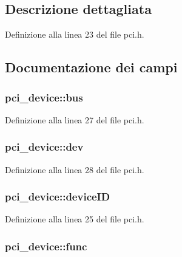\subsection{Descrizione dettagliata}


Definizione alla linea 23 del file pci.\+h.



\subsection{Documentazione dei campi}
\hypertarget{structpci__device_a832940e219d52a08725a39fc97663d07}{
\subsubsection[{bus}]{ pci\+\_\+device\+::bus}}\label{structpci__device_a832940e219d52a08725a39fc97663d07}


Definizione alla linea 27 del file pci.\+h.

\hypertarget{structpci__device_ae456e0d5fb85c5d367b1a4e27f996b96}{
\subsubsection[{dev}]{ pci\+\_\+device\+::dev}}\label{structpci__device_ae456e0d5fb85c5d367b1a4e27f996b96}


Definizione alla linea 28 del file pci.\+h.

\hypertarget{structpci__device_a86ce8ddd306b0395037ec7eee789a929}{
\subsubsection[{device\+I\+D}]{ pci\+\_\+device\+::device\+I\+D}}\label{structpci__device_a86ce8ddd306b0395037ec7eee789a929}


Definizione alla linea 25 del file pci.\+h.

\hypertarget{structpci__device_ac292358b1097064cb388125a45740aff}{
\subsubsection[{func}]{ pci\+\_\+device\+::func}}\label{structpci__device_ac292358b1097064cb388125a45740aff}


